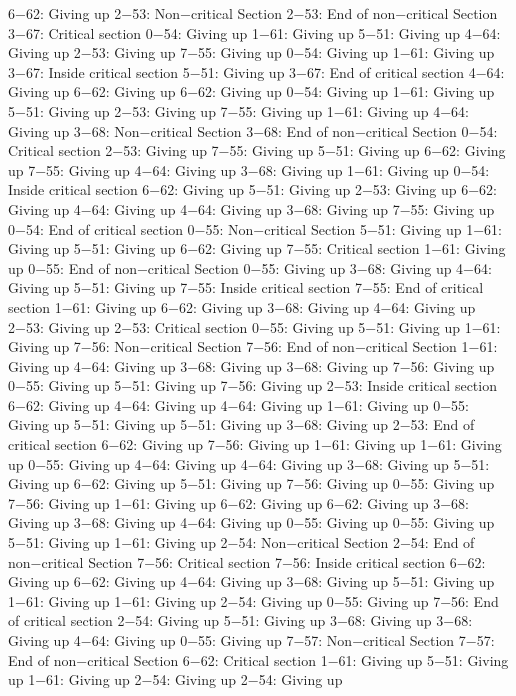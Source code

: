 6−62: Giving up
2−53: Non−critical Section
2−53: End of non−critical Section
3−67: Critical section
0−54: Giving up
1−61: Giving up
5−51: Giving up
4−64: Giving up
2−53: Giving up
7−55: Giving up
0−54: Giving up
1−61: Giving up
3−67: Inside critical section
5−51: Giving up
3−67: End of critical section
4−64: Giving up
6−62: Giving up
6−62: Giving up
0−54: Giving up
1−61: Giving up
5−51: Giving up
2−53: Giving up
7−55: Giving up
1−61: Giving up
4−64: Giving up
3−68: Non−critical Section
3−68: End of non−critical Section
0−54: Critical section
2−53: Giving up
7−55: Giving up
5−51: Giving up
6−62: Giving up
7−55: Giving up
4−64: Giving up
3−68: Giving up
1−61: Giving up
0−54: Inside critical section
6−62: Giving up
5−51: Giving up
2−53: Giving up
6−62: Giving up
4−64: Giving up
4−64: Giving up
3−68: Giving up
7−55: Giving up
0−54: End of critical section
0−55: Non−critical Section
5−51: Giving up
1−61: Giving up
5−51: Giving up
6−62: Giving up
7−55: Critical section
1−61: Giving up
0−55: End of non−critical Section
0−55: Giving up
3−68: Giving up
4−64: Giving up
5−51: Giving up
7−55: Inside critical section
7−55: End of critical section
1−61: Giving up
6−62: Giving up
3−68: Giving up
4−64: Giving up
2−53: Giving up
2−53: Critical section
0−55: Giving up
5−51: Giving up
1−61: Giving up
7−56: Non−critical Section
7−56: End of non−critical Section
1−61: Giving up
4−64: Giving up
3−68: Giving up
3−68: Giving up
7−56: Giving up
0−55: Giving up
5−51: Giving up
7−56: Giving up
2−53: Inside critical section
6−62: Giving up
4−64: Giving up
4−64: Giving up
1−61: Giving up
0−55: Giving up
5−51: Giving up
5−51: Giving up
3−68: Giving up
2−53: End of critical section
6−62: Giving up
7−56: Giving up
1−61: Giving up
1−61: Giving up
0−55: Giving up
4−64: Giving up
4−64: Giving up
3−68: Giving up
5−51: Giving up
6−62: Giving up
5−51: Giving up
7−56: Giving up
0−55: Giving up
7−56: Giving up
1−61: Giving up
6−62: Giving up
6−62: Giving up
3−68: Giving up
3−68: Giving up
4−64: Giving up
0−55: Giving up
0−55: Giving up
5−51: Giving up
1−61: Giving up
2−54: Non−critical Section
2−54: End of non−critical Section
7−56: Critical section
7−56: Inside critical section
6−62: Giving up
6−62: Giving up
4−64: Giving up
3−68: Giving up
5−51: Giving up
1−61: Giving up
1−61: Giving up
2−54: Giving up
0−55: Giving up
7−56: End of critical section
2−54: Giving up
5−51: Giving up
3−68: Giving up
3−68: Giving up
4−64: Giving up
0−55: Giving up
7−57: Non−critical Section
7−57: End of non−critical Section
6−62: Critical section
1−61: Giving up
5−51: Giving up
1−61: Giving up
2−54: Giving up
2−54: Giving up
